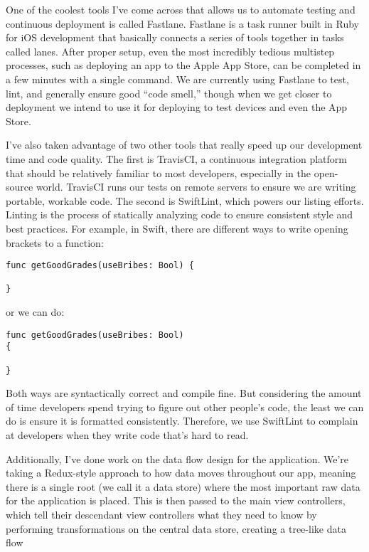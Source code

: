 \documentclass[a4paper]{article}
\begin{document}
One of the coolest tools I’ve come across that allows us to automate testing and continuous deployment is called Fastlane. Fastlane is a task runner built in Ruby for iOS development that basically connects a series of tools together in tasks called lanes. After proper setup, even the most incredibly tedious multistep processes, such as deploying an app to the Apple App Store, can be completed in a few minutes with a single command. We are currently using Fastlane to test, lint, and generally ensure good “code smell,” though when we get closer to deployment we intend to use it for deploying to test devices and even the App Store.

I’ve also taken advantage of two other tools that really speed up our development time and code quality. The first is TravisCI, a continuous integration platform that should be relatively familiar to most developers, especially in the open-source world. TravisCI runs our tests on remote servers to ensure we are writing portable, workable code. The second is SwiftLint, which powers our listing efforts. Linting is the process of statically analyzing code to ensure consistent style and best practices. For example, in Swift, there are different ways to write opening brackets to a function:

\begin{verbatim}
func getGoodGrades(useBribes: Bool) {

}
\end{verbatim}

or we can do:

\begin{verbatim}
func getGoodGrades(useBribes: Bool)
{

}
\end{verbatim}

Both ways are syntactically correct and compile fine. But considering the amount of time developers spend trying to figure out other people’s code, the least we can do is ensure it is formatted consistently. Therefore, we use SwiftLint to complain at developers when they write code that’s hard to read.

Additionally, I’ve done work on the data flow design for the application. We’re taking a Redux-style approach to how data moves throughout our app, meaning there is a single root (we call it a data store) where the most important raw data for the application is placed. This is then passed to the main view controllers, which tell their descendant view controllers what they need to know by performing transformations on the central data store, creating a tree-like data flow
\end{document}
